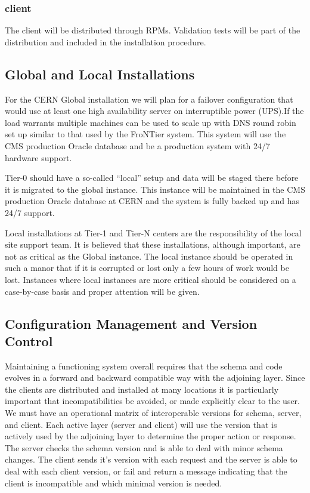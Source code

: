 \documentclass{cmspaper}
\begin{document}
\subsubsection{client}
The client will be distributed through RPMs. Validation tests will be part of the distribution and included in the installation procedure.

\subsection{Global and Local Installations}
 For the CERN Global installation we will plan for a failover configuration that would use at least one high availability server on interruptible power (UPS).If the load warrants multiple machines can be used to scale up with  DNS round robin  set up  similar to that used by the FroNTier system. This system will use the CMS production Oracle database and be a production system with 24/7 hardware support.

Tier-0 should have a so-called ``local'' setup and data will be staged there before it is migrated to the global instance. This instance will be maintained in the CMS production Oracle database at CERN and the system is fully backed up and has 24/7 support.

Local installations at Tier-1 and Tier-N centers are the responsibility of the local site support team. It is believed that these installations, although important, are not as critical as the Global instance. The local instance should be operated in such a manor that  if it  is corrupted or lost only a few hours of work would be lost. Instances where local instances are more critical should be considered on a case-by-case basis and proper attention will be given. 



\subsection{Configuration Management and Version Control}
Maintaining a functioning system overall requires that the schema and code evolves in a  forward and backward compatible way with the adjoining layer. Since the clients are distributed and installed at many locations it is particularly important that incompatibilities be avoided, or made explicitly clear to the user.
We must have an operational matrix of interoperable versions for schema, server, and client.  Each active layer (server and client) will use the version that is actively used by the adjoining layer to determine the proper action or response. The server checks the schema version and is able to deal with minor schema changes.  The client sends it's version with each request and the server is able to deal with each client version, or fail and return a message indicating that the client is incompatible and which minimal version is needed.
\end{document}
